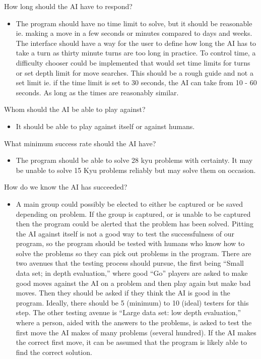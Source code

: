 \documentclass{l3proj}
\begin{document}
How long should the AI have to respond?
\begin{itemize}
\item The program should have no time limit to solve, but it should be reasonable ie. making a move in a few seconds or minutes compared to days and weeks.  The interface should have a way for the user to define how long the AI has to take a turn as thirty minute turns are too long in practice.  To control time, a difficulty chooser could be implemented that would set time limits for turns or set depth limit for move searches.  This should be a rough guide and not a set limit ie. if the time limit is set to 30 seconds, the AI can take from 10 - 60 seconds. As long as the times are reasonably similar.
\end{itemize}
Whom should the AI be able to play against?
\begin{itemize}
\item It should be able to play against itself or against humans.
\end{itemize}
What minimum success rate should the AI have?
\begin{itemize}
\item The program should be able to solve 28 kyu problems with certainty.  It may be unable to solve 15 Kyu problems reliably but may solve them on occasion.
\end{itemize}
How do we know the AI has succeeded?
\begin{itemize}
\item A main group could possibly be elected to either be captured or be saved depending on problem.  If the group is captured, or is unable to be captured then the program could be alerted that the problem has been solved.  Pitting the AI against itself is not a good way to test the successfulness of our program, so the program should be tested with humans who know how to solve the problems so they can pick out problems in the program. There are two avenues that the testing process should pursue, the first being “Small data set; in depth evaluation,” where good “Go” players are asked to make good moves against the AI on a problem and then play again but make bad moves. Then they should be asked if they think the AI is good in the program.  Ideally, there should be 5 (minimum) to 10 (ideal) testers for this step.  The other testing avenue is “Large data set: low depth evaluation,” where a person, aided with the answers to the problems, is asked to test the first move the AI makes of many problems (several hundred). If the AI makes the correct first move, it can be assumed that the program is likely able to find the correct solution.
\end{itemize}
\end{document}
